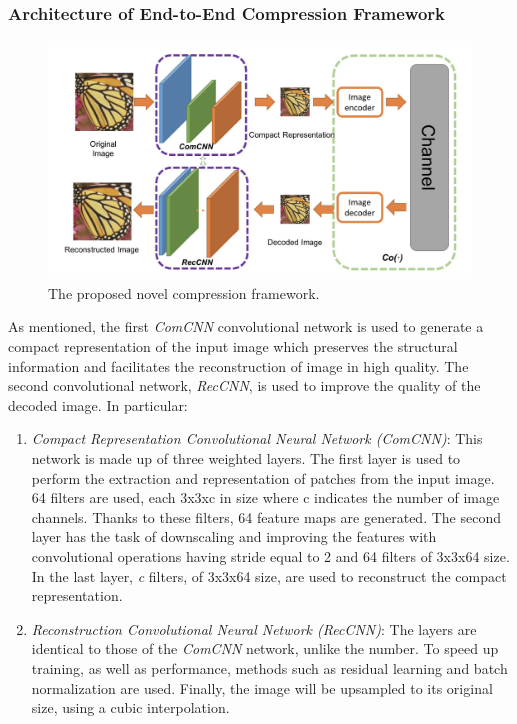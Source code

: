 \subsubsection{Architecture of End-to-End Compression Framework}
\begin{figure}[htbp]
    \centering
    \includegraphics[width = 0.8 \linewidth]{images/paper3/framework.png}
    \centering
    \caption{The proposed novel compression framework.}
    \label{fig:framework}
\end{figure}
As mentioned, the first \emph{ComCNN} convolutional network is used to generate 
a compact representation of the input image which preserves the structural 
information and facilitates the reconstruction of image in high quality. The 
second convolutional network, \emph{RecCNN}, is used to improve the quality of the 
decoded image. In particular:
\begin{enumerate}
    \item \emph{Compact Representation Convolutional Neural Network (ComCNN)}: 
    This network is made up of three weighted layers. The first layer is 
    used to perform the extraction and representation of patches from the 
    input image. 64 filters are used, each 3x3xc in size where c indicates 
    the number of image channels. Thanks to these filters, 64 feature maps 
    are generated. The second layer has the task of downscaling and improving 
    the features with convolutional operations having stride equal to 2 
    and 64 filters of 3x3x64 size. In the last layer, \emph{c} filters, of 3x3x64 
    size, are used to reconstruct the compact representation.
    \item \emph{Reconstruction Convolutional Neural Network (RecCNN)}: The layers 
    are identical to those of the \emph{ComCNN} network, unlike the number. To 
    speed up training, as well as performance, methods such as residual 
    learning and batch normalization \cite{0799924133} are used. Finally, the image will be upsampled to its original size, using a cubic interpolation.
\end{enumerate}
